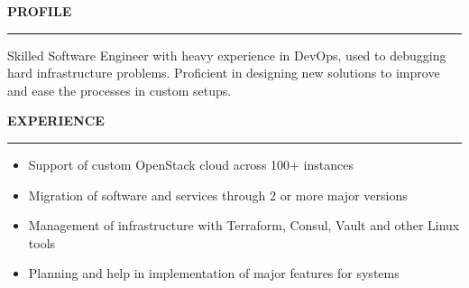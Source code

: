 \documentclass[12pt,a4paper,ragged2e]{altacv}
\renewcommand{\cvsection}[2][]{%
    \bigskip%
    \ifstrequal{#1}{}{}{\marginpar{\vspace*{\dimexpr1pt-\baselineskip}\raggedright}}%
    {\color{heading}\bfseries\MakeUppercase{#2}}\\[-1ex]%
    {\color{heading}\rule{\linewidth}{2pt}\par}\medskip
  }
\begin{document}

\begin{fullwidth}
\makecvheader
\end{fullwidth}



\cvsection[p1sidebar]{Profile}

Skilled Software Engineer with heavy experience in DevOps, used to debugging hard infrastructure problems. Proficient in designing new solutions to improve and ease the processes in custom setups.

\cvsection{Experience}

\begin{itemize}
\item Support of custom OpenStack cloud across 100+ instances
\item Migration of software and services through 2 or more major versions
\item Management of infrastructure with Terraform, Consul, Vault and other Linux tools
\item Planning and help in implementation of major features for systems
\end{itemize}
\end{document}
